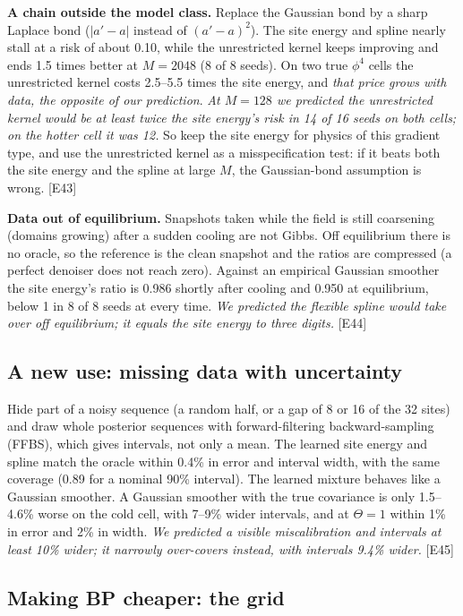 \documentclass[11pt,a4paper]{article}
\newcommand{\src}[1]{{\footnotesize\color{gray}[#1]}}
\newcommand{\fals}[1]{{\small\itshape #1}}
\begin{document}
\textbf{A chain outside the model class.} Replace the Gaussian bond by a sharp Laplace bond ($|a'-a|$ instead of $(a'-a)^2$). The
site energy and spline nearly stall at a risk of about 0.10, while the unrestricted kernel keeps improving and ends 1.5 times better
at $M=2048$ (8 of 8 seeds). On two true $\phi^4$ cells the unrestricted kernel costs 2.5--5.5 times the site energy, and
\fals{that price grows with data, the opposite of our prediction}. \fals{At $M=128$ we predicted the unrestricted kernel would be at least twice the site energy's risk in 14 of 16 seeds on both cells;
on the hotter cell it was 12.} So keep the site energy for physics of this gradient type, and use the
unrestricted kernel as a misspecification test: if it beats both the site energy and the spline at large $M$, the Gaussian-bond
assumption is wrong. \src{E43}

\textbf{Data out of equilibrium.} Snapshots taken while the field is still coarsening (domains growing) after a sudden cooling are not
Gibbs. Off equilibrium there is no oracle, so the reference is the clean snapshot and the ratios are compressed (a perfect denoiser
does not reach zero). Against an empirical Gaussian smoother the site energy's ratio is 0.986 shortly after cooling and 0.950 at
equilibrium, below 1 in 8 of 8 seeds at every time. \fals{We predicted the flexible spline would take over off equilibrium; it
equals the site energy to three digits.} \src{E44}

\subsection{A new use: missing data with uncertainty}

Hide part of a noisy sequence (a random half, or a gap of 8 or 16 of the 32 sites) and draw whole posterior sequences with
forward-filtering backward-sampling (FFBS), which gives intervals, not only a mean. The learned site energy and spline match the oracle
within 0.4\% in error and interval width, with the same coverage (0.89 for a nominal 90\% interval). The learned mixture behaves like
a Gaussian smoother. A Gaussian smoother with the true covariance is only 1.5--4.6\% worse on the cold cell, with 7--9\% wider
intervals, and at $\Theta=1$ within 1\% in error and 2\% in width. \fals{We predicted a visible miscalibration and intervals at least 10\% wider; it
narrowly over-covers instead, with intervals 9.4\% wider.} \src{E45}

\subsection{Making BP cheaper: the grid}
\end{document}
